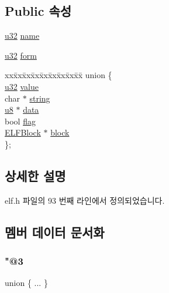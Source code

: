 \subsection*{Public 속성}
\begin{DoxyCompactItemize}
\item 
\mbox{\hyperlink{_system_8h_a10e94b422ef0c20dcdec20d31a1f5049}{u32}} \mbox{\hyperlink{struct_e_l_f_attr_aae677b759e5864de3ec3948837a65700}{name}}
\item 
\mbox{\hyperlink{_system_8h_a10e94b422ef0c20dcdec20d31a1f5049}{u32}} \mbox{\hyperlink{struct_e_l_f_attr_a21299233079c1bb24e10eea813f6f1b6}{form}}
\item 
\begin{tabbing}
xx\=xx\=xx\=xx\=xx\=xx\=xx\=xx\=xx\=\kill
union \{\\
\>\mbox{\hyperlink{_system_8h_a10e94b422ef0c20dcdec20d31a1f5049}{u32}} \mbox{\hyperlink{struct_e_l_f_attr_ace26325a106d1a8616f1ecb2e0a209af}{value}}\\
\>char $\ast$ \mbox{\hyperlink{struct_e_l_f_attr_aed4d1145aa992f05614f2627df516845}{string}}\\
\>\mbox{\hyperlink{_system_8h_aed742c436da53c1080638ce6ef7d13de}{u8}} $\ast$ \mbox{\hyperlink{struct_e_l_f_attr_a050f3a442c8113639c5f3b614300b181}{data}}\\
\>bool \mbox{\hyperlink{struct_e_l_f_attr_aa1241e542253a24e5df8b0102602d0a9}{flag}}\\
\>\mbox{\hyperlink{struct_e_l_f_block}{ELFBlock}} $\ast$ \mbox{\hyperlink{struct_e_l_f_attr_a2f3b05bdc1a38fd871bbd17017e14a75}{block}}\\
\}; \\

\end{tabbing}\end{DoxyCompactItemize}


\subsection{상세한 설명}


elf.\+h 파일의 93 번째 라인에서 정의되었습니다.



\subsection{멤버 데이터 문서화}
\mbox{\label{struct_e_l_f_attr_a1aa1501a9a9ab1d25817c77736aeba90}} 
\subsubsection{\texorpdfstring{"@3}{@3}}
{\footnotesize\ttfamily union \{ ... \} }

